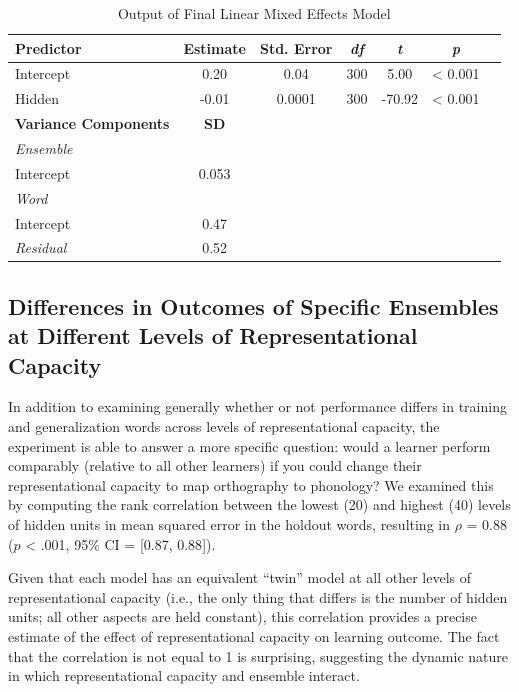 \documentclass[
  ,man,floatsintext]{apa6}
\begin{document}
\begin{table}[ht]
\centering
\caption{Output of Final Linear Mixed Effects Model}
\begin{tabular}{lcccccc}
\toprule
\textbf{Predictor} & \textbf{Estimate} & \textbf{Std. Error} & \textit{df} & \textit{t} & \textit{p} \\
\midrule
Intercept & 0.20 & 0.04 & 300 & 5.00 & < 0.001 \\
Hidden & -0.01 & 0.0001 & 300 & -70.92 & < 0.001 \\
\midrule
\textbf{Variance Components} & \textbf{SD} & & & & \\
\midrule
\multicolumn{6}{l}{\textit{Ensemble}} \\
\hspace{1em}Intercept & 0.053 & & & & \\
\midrule
\multicolumn{6}{l}{\textit{Word}} \\
\hspace{1em}Intercept & 0.47 & & & & \\
\textit{Residual} & 0.52 & & & & \\
\bottomrule
\end{tabular}
\end{table}

\subsection{Differences in Outcomes of Specific Ensembles at Different Levels of Representational Capacity}\label{differences-in-outcomes-of-specific-ensembles-at-different-levels-of-representational-capacity}

In addition to examining generally whether or not performance differs in training and generalization words across levels of representational capacity, the experiment is able to answer a more specific question: would a learner perform comparably (relative to all other learners) if you could change their representational capacity to map orthography to phonology? We examined this by computing the rank correlation between the lowest (20) and highest (40) levels of hidden units in mean squared error in the holdout words, resulting in \(\rho\) = 0.88 (\(p\) \textless{} .001, 95\% CI = {[}0.87, 0.88{]}).

Given that each model has an equivalent ``twin'' model at all other levels of representational capacity (i.e., the only thing that differs is the number of hidden units; all other aspects are held constant), this correlation provides a precise estimate of the effect of representational capacity on learning outcome. The fact that the correlation is not equal to 1 is surprising, suggesting the dynamic nature in which representational capacity and ensemble interact.
\end{document}
